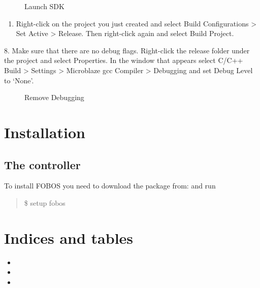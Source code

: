 \documentclass[letterpaper,10pt,english]{sphinxmanual}
\begin{document}
\begin{figure}[htbp]
\centering
\capstart

\noindent{}
\caption{Launch SDK}\label{\detokenize{quickstart:id5}}\end{figure}
\begin{enumerate}
%
\setcounter{enumi}{6}
\item {} 
Right-click on the project you just created and select Build Configurations \textgreater{} Set Active \textgreater{} Release. Then right-click again and select Build Project.

\end{enumerate}

8. Make sure that there are no debug flags. Right-click the release folder under the project and select Properties. In the window that appears
select C/C++ Build \textgreater{} Settings \textgreater{} Microblaze gcc Compiler \textgreater{} Debugging and set Debug Level to ‘None’.

\begin{figure}[htbp]
\centering
\capstart

\noindent{}
\caption{Remove Debugging}\label{\detokenize{quickstart:id6}}\end{figure}


\chapter{Installation}
\label{\detokenize{help:installation}}\label{\detokenize{help::doc}}

\section{The controller}
\label{\detokenize{help:the-controller}}
To install FOBOS you need to download the package from:
and run
\begin{quote}

\$ setup fobos
\end{quote}


\chapter{Indices and tables}
\label{\detokenize{index:indices-and-tables}}\begin{itemize}
\item {} 

\item {} 

\item {} 

\end{itemize}



\renewcommand{\indexname}{Index}
\printindex
\end{document}
